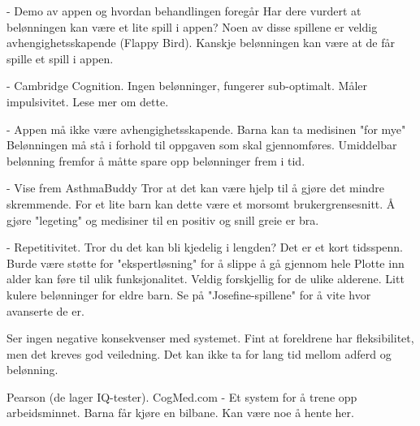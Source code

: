 - Demo av appen og hvordan behandlingen foregår
	Har dere vurdert at belønningen kan være et lite spill i appen?
	Noen av disse spillene er veldig avhengighetsskapende (Flappy Bird). Kanskje belønningen kan være at de får spille et spill i appen.


- Cambridge Cognition. Ingen belønninger, fungerer sub-optimalt. Måler impulsivitet.
	Lese mer om dette. 

- Appen må ikke være avhengighetsskapende. Barna kan ta medisinen "for mye"
	Belønningen må stå i forhold til oppgaven som skal gjennomføres. 
	Umiddelbar belønning fremfor å måtte spare opp belønninger frem i tid. 



- Vise frem AsthmaBuddy
	Tror at det kan være hjelp til å gjøre det mindre skremmende.
	For et lite barn kan dette være et morsomt brukergrensesnitt.
	Å gjøre "legeting" og medisiner til en positiv og snill greie er bra.


- Repetitivitet. Tror du det kan bli kjedelig i lengden?
	Det er et kort tidsspenn.
	Burde være støtte for "ekspertløsning" for å slippe å gå gjennom hele
	Plotte inn alder kan føre til ulik funksjonalitet.
	Veldig forskjellig for de ulike alderene. 
	Litt kulere belønninger for eldre barn.
	Se på "Josefine-spillene" for å vite hvor avanserte de er.

Ser ingen negative konsekvenser med systemet. Fint at foreldrene har fleksibilitet, men det kreves god veiledning. 
Det kan ikke ta for lang tid mellom adferd og belønning. 



Pearson (de lager IQ-tester). CogMed.com - Et system for å trene opp arbeidsminnet. Barna får kjøre en bilbane. Kan være noe å hente her. 